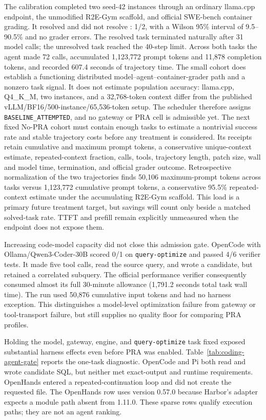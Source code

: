 \documentclass[11pt]{article}
\begin{document}
The calibration completed two seed-42 instances through an ordinary
llama.cpp endpoint, the unmodified R2E-Gym scaffold, and official SWE-bench
container grading. It resolved  and did not resolve
: 1/2, with a Wilson 95\% interval of
9.5--90.5\% and no grader errors. The resolved task terminated naturally after
31 model calls; the unresolved task reached the 40-step limit. Across both
tasks the agent made 72 calls, accumulated 1,123,772 prompt tokens and 11,878
completion tokens, and recorded 607.4 seconds of trajectory time. The small
cohort does establish a functioning distributed
model--agent--container-grader path and a nonzero task signal. It does not
estimate population accuracy: llama.cpp, Q4\_K\_M, two instances, and a
32,768-token context differ from the published
vLLM/BF16/500-instance/65,536-token setup. The scheduler therefore assigns
\texttt{BASELINE\_ATTEMPTED}, and no gateway or PRA cell is admissible yet.
The next fixed No-PRA cohort must contain enough tasks to estimate a nontrivial
success rate and stable trajectory costs before any treatment is considered.
Its receipts retain cumulative and maximum prompt tokens, a conservative
unique-context estimate, repeated-context fraction, calls, tools, trajectory
length, patch size, wall and model time, termination, and official grader
outcome. Retrospective normalization of the two trajectories finds 50,106
maximum-prompt tokens across tasks versus 1,123,772 cumulative prompt tokens,
a conservative 95.5\% repeated-context estimate under the accumulating
R2E-Gym scaffold. This load is a primary future treatment target, but savings
will count only beside a matched solved-task rate. TTFT and prefill remain
explicitly unmeasured when the endpoint does not expose them.

Increasing code-model capacity did not close this admission gate. OpenCode with
Ollama/Qwen3-Coder-30B scored 0/1 on
\texttt{query-optimize} and passed 4/6 verifier tests. It made five tool calls,
read the source query, and wrote a candidate, but retained a correlated
subquery. The official performance verifier consequently consumed almost its
full 30-minute allowance (1,791.2 seconds total task wall time). The run used
50,876 cumulative input tokens and had no harness exception. This distinguishes
a model-level optimization failure from gateway or tool-transport failure, but
still supplies no quality floor for comparing PRA profiles.

Holding the model, gateway, engine, and \texttt{query-optimize} task fixed
exposed substantial harness effects even before PRA was enabled.
Table~\ref{tab:coding-agent-gate} reports the one-task diagnostic. OpenCode and
Pi both read and wrote candidate SQL, but neither met exact-output and runtime
requirements. OpenHands entered a repeated-continuation loop and did not create
the requested file. The OpenHands row uses version 0.57.0 because Harbor's
adapter expects a module path absent from 1.11.0. These sparse rows qualify
execution paths; they are not an agent ranking.
\end{document}
